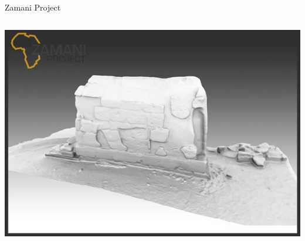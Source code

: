 \documentclass{beamer}
\begin{document}
\begin{frame}{Zamani Project}
\begin{columns}
\begin{column}{.35\linewidth}
\includegraphics[width=\linewidth]{images/zamani2.jpg}
\end{column}
\end{columns}

\end{frame}
\end{document}
